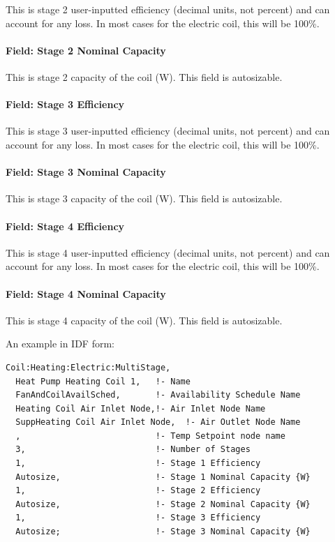 This is stage 2 user-inputted efficiency (decimal units, not percent) and can account for any loss. In most cases for the electric coil, this will be 100\%.

\paragraph{Field: Stage 2 Nominal Capacity}\label{field-stage-2-nominal-capacity}

This is stage 2 capacity of the coil (W). This field is autosizable.

\paragraph{Field: Stage 3 Efficiency}\label{field-stage-3-efficiency}

This is stage 3 user-inputted efficiency (decimal units, not percent) and can account for any loss. In most cases for the electric coil, this will be 100\%.

\paragraph{Field: Stage 3 Nominal Capacity}\label{field-stage-3-nominal-capacity}

This is stage 3 capacity of the coil (W). This field is autosizable.

\paragraph{Field: Stage 4 Efficiency}\label{field-stage-4-efficiency}

This is stage 4 user-inputted efficiency (decimal units, not percent) and can account for any loss. In most cases for the electric coil, this will be 100\%.

\paragraph{Field: Stage 4 Nominal Capacity}\label{field-stage-4-nominal-capacity}

This is stage 4 capacity of the coil (W). This field is autosizable.

An example in IDF form:

\begin{lstlisting}
Coil:Heating:Electric:MultiStage,
  Heat Pump Heating Coil 1,   !- Name
  FanAndCoilAvailSched,       !- Availability Schedule Name
  Heating Coil Air Inlet Node,!- Air Inlet Node Name
  SuppHeating Coil Air Inlet Node,  !- Air Outlet Node Name
  ,                           !- Temp Setpoint node name
  3,                          !- Number of Stages
  1,                          !- Stage 1 Efficiency
  Autosize,                   !- Stage 1 Nominal Capacity {W}
  1,                          !- Stage 2 Efficiency
  Autosize,                   !- Stage 2 Nominal Capacity {W}
  1,                          !- Stage 3 Efficiency
  Autosize;                   !- Stage 3 Nominal Capacity {W}
\end{lstlisting}

